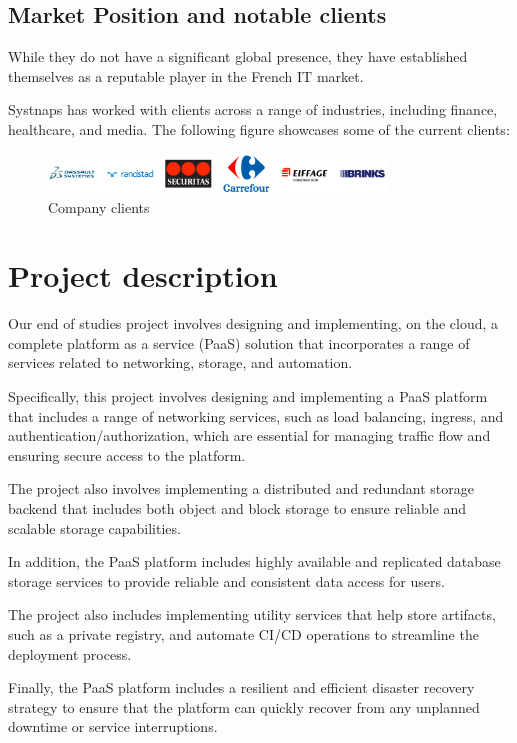 \subsection{Market Position and notable clients }

While they do not have a significant global presence, they have established themselves as a reputable player in the French IT market. 

Systnaps has worked with clients across a range of industries, including finance, healthcare, and media. The following figure showcases some of the current clients: 


\begin{figure}[!ht]\centering
\includegraphics[width=0.8\textwidth,angle=00]{assets/fc.png}
\caption{Company clients}
\end{figure}


\section{Project description }

Our end of studies project involves designing and implementing, on the cloud, a complete platform as a service (PaaS) solution that incorporates a range of services related to networking, storage, and automation. 

Specifically, this project involves designing and implementing a PaaS platform that includes a range of networking services, such as load balancing, ingress, and authentication/authorization, which are essential for managing traffic flow and ensuring secure access to the platform. 

The project also involves implementing a distributed and redundant storage backend that includes both object and block storage to ensure reliable and scalable storage capabilities. 

In addition, the PaaS platform includes highly available and replicated database storage services to provide reliable and consistent data access for users. 

The project also includes implementing utility services that help store artifacts, such as a private registry, and automate CI/CD operations to streamline the deployment process. 


Finally, the PaaS platform includes a resilient and efficient disaster recovery strategy to ensure that the platform can quickly recover from any unplanned downtime or service interruptions. 


